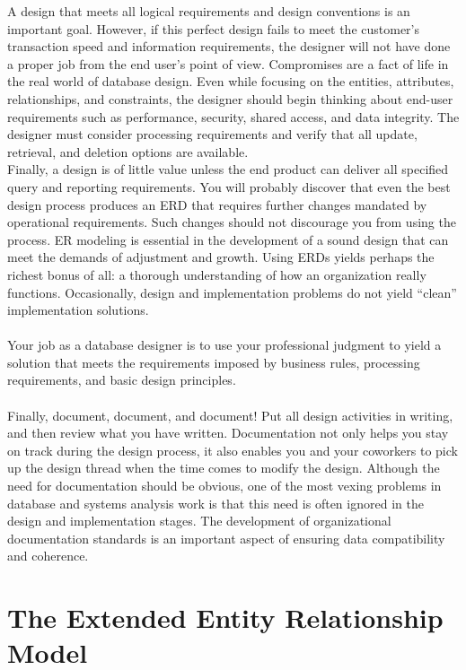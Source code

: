 \documentclass[a4paper, 12pt, titlepage]{report}
\begin{document}
{\noindent A design that meets all logical requirements and design conventions is an important goal. However, if this perfect design fails to meet the customer’s transaction speed and information requirements, the designer will not have done a proper job from the end user’s point of view. Compromises are a fact of life in the real world of database design.
Even while focusing on the entities, attributes, relationships, and constraints, the designer should begin thinking about end-user requirements such as performance, security, shared access, and data integrity. The designer must consider processing requirements and verify that all update, retrieval, and deletion options are available.\\
Finally, a design is of little value unless the end product can deliver all specified query and reporting requirements. You will probably discover that even the best design process produces an ERD that requires further changes mandated by operational requirements. Such changes should not discourage you from using the process. ER modeling is essential in the development of a sound design that can meet the demands of adjustment and growth. Using ERDs yields perhaps the richest bonus of all: a thorough understanding of how an organization really functions. Occasionally, design and implementation problems do not yield “clean” implementation solutions.\\\\
Your job as a database designer is to use your professional judgment to yield a solution that meets the requirements imposed by business rules, processing requirements, and basic design principles.\\\\
Finally, document, document, and document! Put all design activities in writing, and then review what you have written. Documentation not only helps you stay on track
during the design process, it also enables you and your coworkers to pick up the design thread when the time comes to modify the design. Although the need for documentation should be obvious, one of the most vexing problems in database and systems analysis work is that this need is often ignored in the design and implementation stages. The development of organizational documentation standards is an important aspect of ensuring data compatibility and coherence.

\section{The Extended Entity Relationship Model}
}
\end{document}
